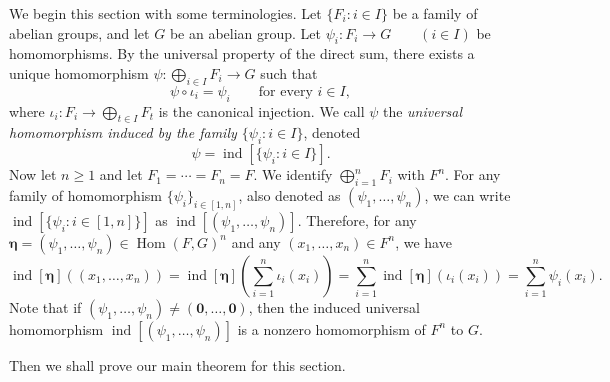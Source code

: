 \documentclass[10pt,a4paper]{amsart}
\begin{document}
We begin this section with some terminologies. Let $\{F_i:i\in I\}$ be a family of abelian groups, and let $G$ be an
abelian group. Let
$\psi_i:F_i\longrightarrow G \qquad (i\in I)$
be homomorphisms. By the universal property of the direct sum, there
exists a unique homomorphism
$
  \psi:\bigoplus\limits_{i\in I}F_i\longrightarrow G
$
such that
\begin{equation}\label{equation universal map}
  \psi\circ\iota_i=\psi_i
  \qquad\text{for every }i\in I,
\end{equation}
where
$
  \iota_i:F_i\longrightarrow\bigoplus\limits_{t\in I}F_t
$
is the canonical injection. We call $\psi$ the \emph{universal
homomorphism induced by the family $\{\psi_i:i\in I\}$}, denoted
$$\psi=\operatorname{ind}[\{\psi_i:i\in I\}].$$
Now let $n\geq 1$ and let $F_1=\cdots=F_n=F$. We identify
$\bigoplus\limits_{i=1}^n F_i$ with $F^n$. For any family of homomorphism
$\{\psi_i\}_{i\in [1,n]}$, also denoted as $(\psi_1,\ldots,\psi_n)$, we can write
$\operatorname{ind}[\{\psi_i:i\in [1,n]\}]$ as $\operatorname{ind}[(\psi_1,\ldots,\psi_n)].$
Therefore, for any $\boldsymbol{\eta}=(\psi_1,\ldots,\psi_n)\in \operatorname{Hom}(F,G)^n$ and any $(x_1,\ldots,x_n)\in F^n$,
we have
\begin{equation}\label{eq:induced-explicit}
\operatorname{ind}[\boldsymbol{\eta}]\left((x_1,\ldots,x_n)\right)=\operatorname{ind}[\boldsymbol{\eta}]\left(\sum\limits_{i=1}^n \iota_i(x_i)\right)=\sum\limits_{i=1}^n  \operatorname{ind}[\boldsymbol{\eta}]\left(\iota_i(x_i)\right)=\sum\limits_{i=1}^n \psi_i(x_i).
\end{equation}
Note that if $(\psi_1,\ldots,\psi_n)\neq (\mathbf 0,\ldots,\mathbf 0)$, then the induced universal
homomorphism $\operatorname{ind}[(\psi_1,\ldots,\psi_n)]$ is a nonzero homomorphism of $F^n$ to $G$.

Then we shall prove our main theorem for this section.
\end{document}
